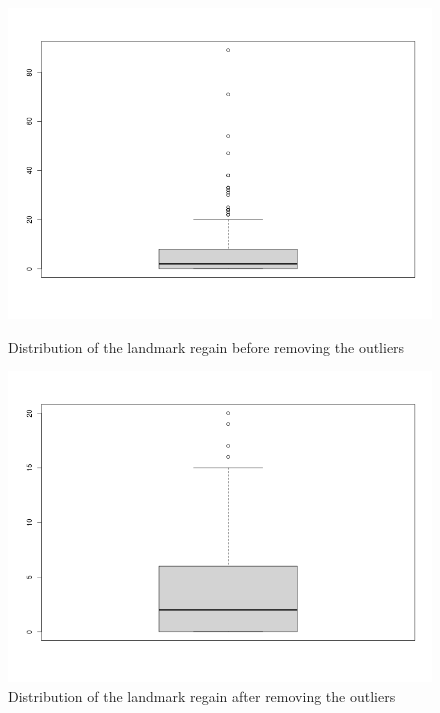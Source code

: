 \begin{figure}[tpb]
\centering
	\begin{minipage}[b]{0.46\columnwidth}
	\includegraphics[width=\columnwidth]{img/outliers_regain.png}
	\caption{Distribution of the landmark regain before removing the outliers}			
	\label{fig:b5}
	\end{minipage}
	\quad
	\begin{minipage}[b]{0.50\columnwidth}
	\includegraphics[width=\columnwidth]{img/outliers_regain_fixed.png}
	\caption{Distribution of the landmark regain after removing the outliers}
	\label{fig:b6}
	\end{minipage}
\end{figure}


